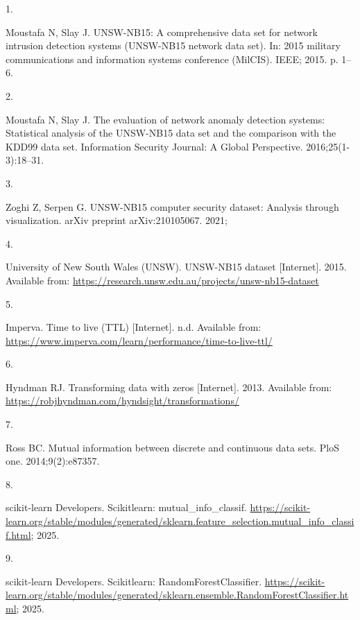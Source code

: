 \documentclass[
  a4paper,
]{scrreprt}
\newlength{\cslhangindent}
\newlength{\csllabelwidth}
\newenvironment{CSLReferences}[2] %
 {\begin{list}{}{%
  \setlength{\itemindent}{0pt}
  \setlength{\leftmargin}{0pt}
  \setlength{\parsep}{0pt}
  \ifodd #1
   \setlength{\leftmargin}{\cslhangindent}
   \setlength{\itemindent}{-1\cslhangindent}
  \fi
  \setlength{\itemsep}{#2\baselineskip}}}
 {\end{list}}
\newcommand{\CSLLeftMargin}[1]{\parbox[t]{\csllabelwidth}{\strut#1\strut}}
\newcommand{\CSLRightInline}[1]{\parbox[t]{\linewidth - \csllabelwidth}{\strut#1\strut}}
\begin{document}
\label{refs}
\begin{CSLReferences}{0}{1}
\CSLLeftMargin{1. }%
\CSLRightInline{Moustafa N, Slay J. UNSW-NB15: A comprehensive data set
for network intrusion detection systems (UNSW-NB15 network data set).
In: 2015 military communications and information systems conference
(MilCIS). IEEE; 2015. p. 1--6. }

\CSLLeftMargin{2. }%
\CSLRightInline{Moustafa N, Slay J. The evaluation of network anomaly
detection systems: Statistical analysis of the UNSW-NB15 data set and
the comparison with the KDD99 data set. Information Security Journal: A
Global Perspective. 2016;25(1-3):18--31. }

\CSLLeftMargin{3. }%
\CSLRightInline{Zoghi Z, Serpen G. UNSW-NB15 computer security dataset:
Analysis through visualization. arXiv preprint arXiv:210105067. 2021; }

\CSLLeftMargin{4. }%
\CSLRightInline{University of New South Wales (UNSW). UNSW-NB15 dataset
{[}Internet{]}. 2015. Available from:
\url{https://research.unsw.edu.au/projects/unsw-nb15-dataset}}

\CSLLeftMargin{5. }%
\CSLRightInline{Imperva. Time to live (TTL) {[}Internet{]}. n.d.
Available from:
\url{https://www.imperva.com/learn/performance/time-to-live-ttl/}}

\CSLLeftMargin{6. }%
\CSLRightInline{Hyndman RJ. Transforming data with zeros {[}Internet{]}.
2013. Available from:
\url{https://robjhyndman.com/hyndsight/transformations/}}

\CSLLeftMargin{7. }%
\CSLRightInline{Ross BC. Mutual information between discrete and
continuous data sets. PloS one. 2014;9(2):e87357. }

\CSLLeftMargin{8. }%
\CSLRightInline{scikit‑learn Developers. Scikit\-learn:
mutual\_info\_classif.
\url{https://scikit-learn.org/stable/modules/generated/sklearn.feature_selection.mutual_info_classif.html};
2025. }

\CSLLeftMargin{9. }%
\CSLRightInline{scikit‑learn Developers. Scikit\-learn:
RandomForestClassifier.
\url{https://scikit-learn.org/stable/modules/generated/sklearn.ensemble.RandomForestClassifier.html};
2025. }


\end{CSLReferences}
\end{document}
